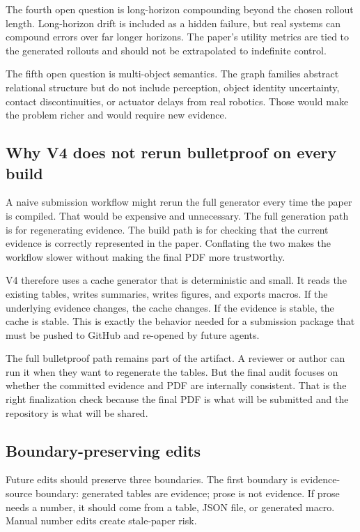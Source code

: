 \documentclass{article}
\begin{document}
The fourth open question is long-horizon compounding beyond the chosen rollout
length.  Long-horizon drift is included as a hidden failure, but real systems can
compound errors over far longer horizons.  The paper's utility metrics are tied
to the generated rollouts and should not be extrapolated to indefinite control.

The fifth open question is multi-object semantics.  The graph families abstract
relational structure but do not include perception, object identity uncertainty,
contact discontinuities, or actuator delays from real robotics.  Those would
make the problem richer and would require new evidence.

\subsection{Why V4 does not rerun bulletproof on every build}

A naive submission workflow might rerun the full generator every time the paper
is compiled.  That would be expensive and unnecessary.  The full generation path
is for regenerating evidence.  The build path is for checking that the current
evidence is correctly represented in the paper.  Conflating the two makes the
workflow slower without making the final PDF more trustworthy.

V4 therefore uses a cache generator that is deterministic and small.  It reads
the existing tables, writes summaries, writes figures, and exports macros.  If
the underlying evidence changes, the cache changes.  If the evidence is stable,
the cache is stable.  This is exactly the behavior needed for a submission
package that must be pushed to GitHub and re-opened by future agents.

The full bulletproof path remains part of the artifact.  A reviewer or author
can run it when they want to regenerate the tables.  But the final audit focuses
on whether the committed evidence and PDF are internally consistent.  That is
the right finalization check because the final PDF is what will be submitted and
the repository is what will be shared.

\subsection{Boundary-preserving edits}

Future edits should preserve three boundaries.  The first boundary is
evidence-source boundary: generated tables are evidence; prose is not evidence.
If prose needs a number, it should come from a table, JSON file, or generated
macro.  Manual number edits create stale-paper risk.
\end{document}

